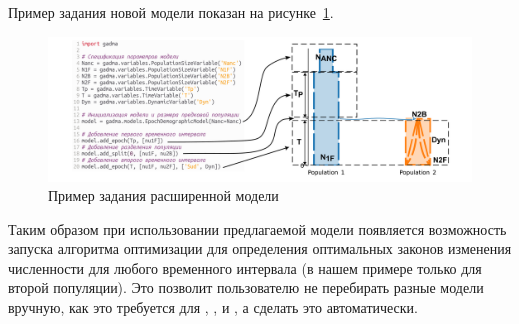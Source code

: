 \documentclass[a4paper,14pt,oneside,openany,article]{memoir}
\begin{document}

Пример задания новой модели показан на рисунке~\ref{fig:new_model:model_spec}.
\begin{figure}[h]
    \centering
    \includegraphics[width=\linewidth]{images_2/gadma_model.pdf}
    \caption{Пример задания расширенной модели}
    \label{fig:new_model:model_spec}
\end{figure}

Таким образом при использовании предлагаемой модели появляется возможность запуска алгоритма оптимизации для определения оптимальных законов изменения численности для любого временного интервала (в нашем примере только для второй популяции). Это позволит пользователю не перебирать разные модели вручную, как это требуется для \dadi, \moments, \momentsLD и \momi, а сделать это автоматически.
\end{document}
